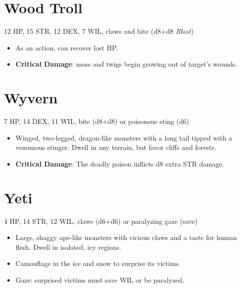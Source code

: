 \documentclass[
  10pt,
  american,
]{article}
\begin{document}
\hypertarget{wood-troll}{%
\section{Wood Troll}\label{wood-troll}}

12 HP, 15 STR, 12 DEX, 7 WIL, claws and bite (d8+d8 \emph{Blast})

\begin{samepage}
\begin{itemize}
\setlength\itemsep{-.5em}
\item As an action, can recover lost HP.
\item \textbf{Critical Damage}: moss and twigs begin growing out of target’s wounds.
\end{itemize}
\end{samepage}

\hypertarget{wyvern}{%
\section{Wyvern}\label{wyvern}}

7 HP, 14 DEX, 11 WIL, bite (d8+d8) or poisonous sting (d6)

\begin{samepage}
\begin{itemize}
\setlength\itemsep{-.5em}
\item Winged, two-legged, dragon-like monsters with a long tail tipped with a venomous stinger. Dwell in any terrain, but favor cliffs and forests.
\item \textbf{Critical Damage}: The deadly poison inflicts d8 extra STR damage.
\end{itemize}
\end{samepage}

\hypertarget{yeti}{%
\section{Yeti}\label{yeti}}

4 HP, 14 STR, 12 WIL, claws (d6+d6) or paralyzing gaze (save)

\begin{samepage}
\begin{itemize}
\setlength\itemsep{-.5em}
\item Large, shaggy ape-like monsters with vicious claws and a taste for human flesh. Dwell in isolated, icy regions.
\item Camouflage in the ice and snow to surprise its victims.
\item Gaze: surprised victims must save WIL or be paralyzed.
\end{itemize}
\end{samepage}
\end{document}
